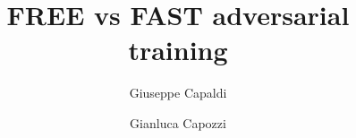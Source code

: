 \documentclass{article}
\begin{document}
\title{FREE vs FAST adversarial training}

\author[1$\dag$]{Giuseppe Capaldi}
\author[2$\dag$]{Gianluca Capozzi}


\maketitle

\begin{abstract}

\end{abstract}
	
\end{document}
